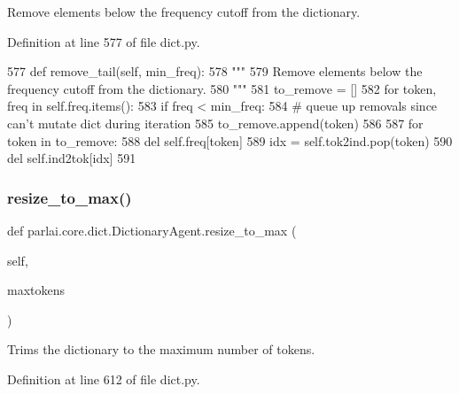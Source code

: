 \begin{DoxyVerb}Remove elements below the frequency cutoff from the dictionary.
\end{DoxyVerb}
 

Definition at line 577 of file dict.\+py.


\begin{DoxyCode}
577     \textcolor{keyword}{def }remove\_tail(self, min\_freq):
578         \textcolor{stringliteral}{"""}
579 \textcolor{stringliteral}{        Remove elements below the frequency cutoff from the dictionary.}
580 \textcolor{stringliteral}{        """}
581         to\_remove = []
582         \textcolor{keywordflow}{for} token, freq \textcolor{keywordflow}{in} self.freq.items():
583             \textcolor{keywordflow}{if} freq < min\_freq:
584                 \textcolor{comment}{# queue up removals since can't mutate dict during iteration}
585                 to\_remove.append(token)
586 
587         \textcolor{keywordflow}{for} token \textcolor{keywordflow}{in} to\_remove:
588             del self.freq[token]
589             idx = self.tok2ind.pop(token)
590             del self.ind2tok[idx]
591 
\end{DoxyCode}
\mbox{\label{classparlai_1_1core_1_1dict_1_1DictionaryAgent_a1a800c1aecdb97986c59fd26f1b55626}} 
\subsubsection{\texorpdfstring{resize\+\_\+to\+\_\+max()}{resize\_to\_max()}}
{\footnotesize\ttfamily def parlai.\+core.\+dict.\+Dictionary\+Agent.\+resize\+\_\+to\+\_\+max (\begin{DoxyParamCaption}\item[{}]{self,  }\item[{}]{maxtokens }\end{DoxyParamCaption})}

\begin{DoxyVerb}Trims the dictionary to the maximum number of tokens.
\end{DoxyVerb}
 

Definition at line 612 of file dict.\+py.


